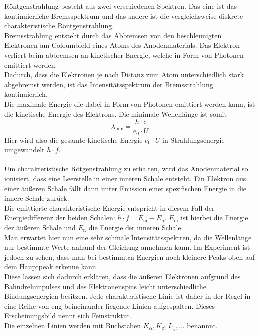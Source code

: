 Röntgenstrahlung besteht aus zwei verschiedenen Spektren. Das 
eine ist das kontinuierliche Bremsspektrum und das andere ist die
vergleichsweise diskrete charakteristische Röntgenstrahlung.\\
Bremsstrahlung entsteht durch das Abbremsen von den beschleunigten
Elektronen am Coloumbfeld eines Atoms des Anodenmaterials. Das Elektron
verliert beim abbremsen an kinetischer Energie, welche in Form von Photonen
emittiert werden.\\
Dadurch, dass die Elektronen je nach Distanz zum Atom unterschiedlich stark
abgebremst werden, ist das Intensitätsspektrum der Bremsstrahlung
kontinuierlich.\\
Die maximale Energie die dabei in Form von Photonen emittiert werden kann, ist die
kinetische Energie des Elektrons. Die minimale Wellenlänge ist somit
\begin{equation}
    \label{eqn:Energiedifferenz}
    \lambda_{\mathrm{min}} = \frac{h\cdot c}{e_0 \cdot U}
\end{equation}
Hier wird also die gesamte kinetische Energie $e_0 \cdot U$ in Strahlungsenergie
umgewandelt $h \cdot f$.\\
\\
Um charakteristische Rötgenstrahlung zu erhalten, wird das Anodenmaterial so ionisiert,
dass eine Leerstelle in einer inneren Schale entsteht. Ein Elektron aus einer äußeren
Schale fällt dann unter Emission einer spezifischen Energie in die innere Schale zurück.\\
Die emittierte charakteristische Energie entspricht in diesem Fall der Energiedifferenz
der beiden Schalen: $h \cdot f = E_{\mathrm{m}} - E_{\mathrm{n}}$. $E_{\mathrm{m}}$ ist hierbei
die Energie der äußeren Schale und $E_{\mathrm{n}}$ die Energie der inneren Schale.\\
Man erwartet hier nun eine sehr schmale Intensitätsspektren, da die Wellenlänge nur bestimmte
Werte anhand der Gleichung annehmen kann. Im Experiment ist jedoch zu sehen, dass man
bei bestimmten Energien noch kleinere Peaks oben auf dem Hauptpeak erkenne kann.\\
Diese lassen sich dadurch erklären, dass die äußeren Elektronen aufgrund des Bahndrehimpulses
und des Elektronenspins leicht unterschiedliche Bindungsenergien besitzen. Jede charakteristische
Linie ist daher in der Regel in eine Reihe von eng beineinander liegende Linien aufgespalten.
Dieses Erscheinungsbild nennt sich Feinstruktur.\\
Die einzelnen Linien werden mit Buchstaben $K_{\alpha}, K_{\beta}, L__{\alpha},...$ benannnt. 
